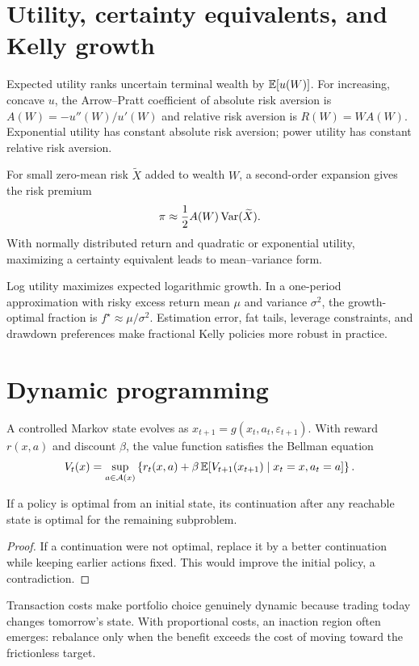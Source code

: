 \section{Utility, certainty equivalents, and Kelly growth}

Expected utility ranks uncertain terminal wealth by $\operatorname{\mathbb E}[u(W)]$. For increasing,
concave $u$, the Arrow--Pratt coefficient of absolute risk aversion is
$A(W)=-u''(W)/u'(W)$ and relative risk aversion is $R(W)=WA(W)$.
Exponential utility has constant absolute risk aversion; power utility has constant
relative risk aversion.

For small zero-mean risk $\widetilde X$ added to wealth $W$, a second-order expansion
gives the risk premium
\[
\pi\approx\frac12A(W)\operatorname{Var}(\widetilde X).
\]
With normally distributed return and quadratic or exponential utility, maximizing a
certainty equivalent leads to mean--variance form.

Log utility maximizes expected logarithmic growth. In a one-period approximation
with risky excess return mean $\mu$ and variance $\sigma^2$, the growth-optimal
fraction is $f^\star\approx\mu/\sigma^2$. Estimation error, fat tails, leverage
constraints, and drawdown preferences make fractional Kelly policies more robust in
practice.

\section{Dynamic programming}

A controlled Markov state evolves as
$x_{t+1}=g(x_t,a_t,\varepsilon_{t+1})$. With reward $r(x,a)$ and discount $\beta$,
the value function satisfies the Bellman equation
\[
V_t(x)=\sup_{a\in\mathcal A(x)}
\left\{r_t(x,a)+\beta\operatorname{\mathbb E}[V_{t+1}(x_{t+1})\mid x_t=x,a_t=a]\right\}.
\]

\begin{theorem}
If a policy is optimal from an initial state, its continuation after any reachable
state is optimal for the remaining subproblem.
\end{theorem}
\begin{proof}
If a continuation were not optimal, replace it by a better continuation while
keeping earlier actions fixed. This would improve the initial policy, a
contradiction.
\end{proof}

Transaction costs make portfolio choice genuinely dynamic because trading today
changes tomorrow's state. With proportional costs, an inaction region often
emerges: rebalance only when the benefit exceeds the cost of moving toward the
frictionless target.

